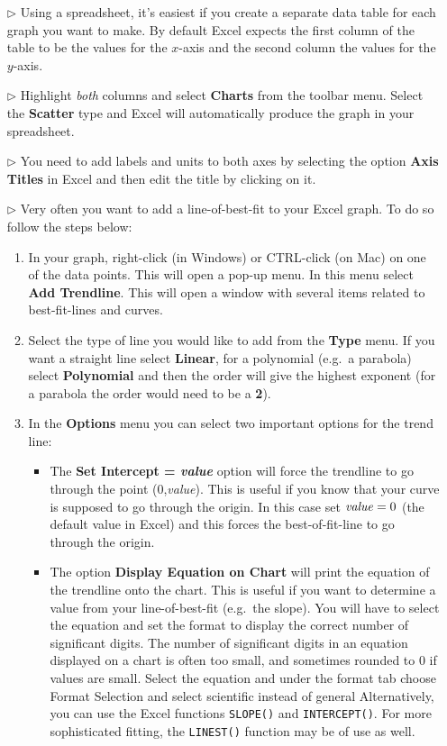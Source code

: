 \begin{itemize}
\item[$\triangleright$] Using a spreadsheet, it's easiest if you create a separate data table for each graph you want to make. By default Excel expects the first column of the table to be the values for the $x$-axis and the second column the values for the $y$-axis.
\item[$\triangleright$] Highlight \textit{both} columns and select \textbf{Charts} from the toolbar menu. Select the \textbf{Scatter} type and Excel will automatically produce the graph in your spreadsheet.
\item[$\triangleright$] You need to add labels and units to both axes by selecting the option \textbf{Axis Titles} in Excel and then edit the title by clicking on it.
\item[$\triangleright$] Very often you want to add a line-of-best-fit to your Excel graph. To do so follow the steps below:
  \begin{enumerate}
  \item In your graph, right-click (in Windows) or CTRL-click (on Mac) on one of the data points. This will open a pop-up menu. In this menu select \textbf{Add Trendline}. This will open a window with several items related to best-fit-lines and curves.
  \item Select the type of line you would like to add from the \textbf{Type} menu. If you want a straight line select \textbf{Linear}, for a polynomial (e.g.\ a parabola) select \textbf{Polynomial} and then the order will give the highest exponent (for a parabola the order would need to be a \textbf{2}).
  \item In the \textbf{Options} menu you can select two important options for the trend line:
    \begin{itemize}
    \item The \textbf{Set Intercept = \textit{value}} option will force the trendline to go through the point (0,\textit{value}). This is useful if you know that your curve is supposed to go through the origin. In this case set $\mbox{\textit{value}} = 0$ (the default value in Excel) and this forces the best-of-fit-line to go through the origin.
    \item The option \textbf{Display Equation on Chart} will print the equation of the trendline onto the chart. This is useful if you want to determine a value from your line-of-best-fit (e.g.\ the slope). You will have to select the equation and set the format to display the correct number of significant digits. The number of significant digits in an equation displayed on a chart is often too small, and sometimes rounded to 0 if values are small. Select the equation and under the format tab choose Format Selection and select scientific instead of general Alternatively, you can use the Excel functions \texttt{SLOPE()} and \texttt{INTERCEPT()}.  For more sophisticated fitting, the \texttt{LINEST()} function may be of use as well.
    \end{itemize}
  \end{enumerate}
\end{itemize}


